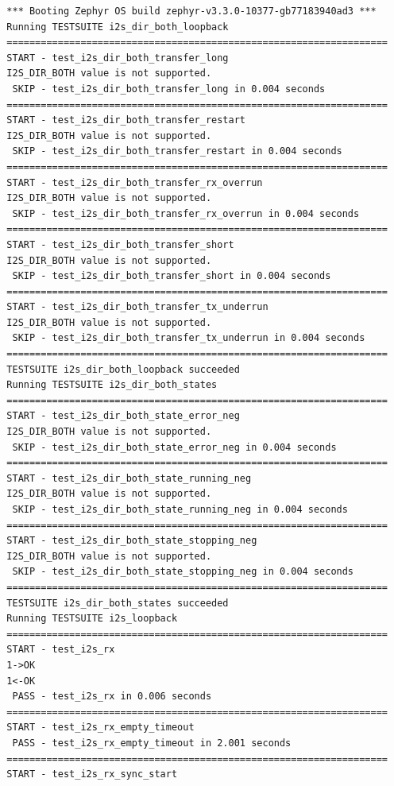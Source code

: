 \documentclass[11pt,a4paper,oneside]{article}
\begin{document}
\begin{lstlisting}
  *** Booting Zephyr OS build zephyr-v3.3.0-10377-gb77183940ad3 ***
  Running TESTSUITE i2s_dir_both_loopback
  ===================================================================
  START - test_i2s_dir_both_transfer_long
  I2S_DIR_BOTH value is not supported.
   SKIP - test_i2s_dir_both_transfer_long in 0.004 seconds
  ===================================================================
  START - test_i2s_dir_both_transfer_restart
  I2S_DIR_BOTH value is not supported.
   SKIP - test_i2s_dir_both_transfer_restart in 0.004 seconds
  ===================================================================
  START - test_i2s_dir_both_transfer_rx_overrun
  I2S_DIR_BOTH value is not supported.
   SKIP - test_i2s_dir_both_transfer_rx_overrun in 0.004 seconds
  ===================================================================
  START - test_i2s_dir_both_transfer_short
  I2S_DIR_BOTH value is not supported.
   SKIP - test_i2s_dir_both_transfer_short in 0.004 seconds
  ===================================================================
  START - test_i2s_dir_both_transfer_tx_underrun
  I2S_DIR_BOTH value is not supported.
   SKIP - test_i2s_dir_both_transfer_tx_underrun in 0.004 seconds
  ===================================================================
  TESTSUITE i2s_dir_both_loopback succeeded
  Running TESTSUITE i2s_dir_both_states
  ===================================================================
  START - test_i2s_dir_both_state_error_neg
  I2S_DIR_BOTH value is not supported.
   SKIP - test_i2s_dir_both_state_error_neg in 0.004 seconds
  ===================================================================
  START - test_i2s_dir_both_state_running_neg
  I2S_DIR_BOTH value is not supported.
   SKIP - test_i2s_dir_both_state_running_neg in 0.004 seconds
  ===================================================================
  START - test_i2s_dir_both_state_stopping_neg
  I2S_DIR_BOTH value is not supported.
   SKIP - test_i2s_dir_both_state_stopping_neg in 0.004 seconds
  ===================================================================
  TESTSUITE i2s_dir_both_states succeeded
  Running TESTSUITE i2s_loopback
  ===================================================================
  START - test_i2s_rx
  1->OK
  1<-OK
   PASS - test_i2s_rx in 0.006 seconds
  ===================================================================
  START - test_i2s_rx_empty_timeout
   PASS - test_i2s_rx_empty_timeout in 2.001 seconds
  ===================================================================
  START - test_i2s_rx_sync_start

\end{lstlisting}
\end{document}
